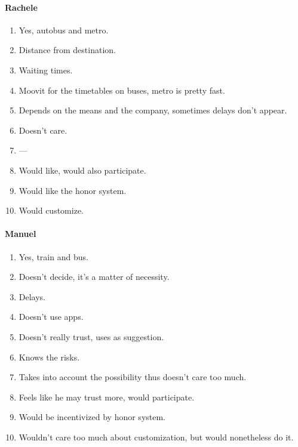 \documentclass[a4paper, 11pt, twocolumn]{article}
\begin{document}
\paragraph*{Rachele}
\begin{enumerate}
	\item Yes, autobus and metro.
	\item Distance from destination.
	\item Waiting times.
	\item Moovit for the timetables on buses, metro is pretty fast.
	\item Depends on the means and the company, sometimes delays don't appear.
	\item Doesn't care.
	\item ---
	\item Would like, would also participate.
	\item Would like the honor system.
	\item Would customize.
\end{enumerate}

\paragraph*{Manuel}
\begin{enumerate}
	\item Yes, train and bus.
	\item Doesn't decide, it's a matter of necessity.
	\item Delays.
	\item Doesn't use apps.
	\item Doesn't really trust, uses as suggestion.
	\item Knows the risks.
	\item Takes into account the possibility thus doesn't care too much.
	\item Feels like he may trust more, would participate.
	\item Would be incentivized by honor system.
	\item Wouldn't care too much about customization, but would nonetheless do it.
\end{enumerate}
\end{document}
